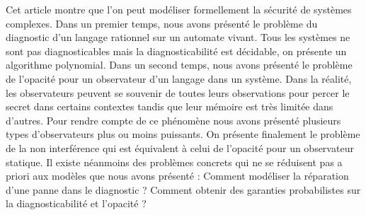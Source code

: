 \documentclass[10pt,a4paper]{article}
\begin{document}
Cet article montre que l'on peut modéliser formellement la sécurité de systèmes complexes. Dans un premier temps, nous avons présenté le problème du diagnostic d'un langage rationnel sur un automate vivant. Tous les systèmes ne sont pas diagnosticables mais la diagnosticabilité est décidable, on présente un algorithme polynomial. Dans un second temps, nous avons présenté le problème de l'opacité  pour un observateur d'un langage dans un système. Dans la réalité, les observateurs peuvent se souvenir de toutes leurs observations pour percer le secret dans certains contextes tandis que leur mémoire est très limitée dans d'autres. Pour rendre compte de ce phénomène nous avons présenté plusieurs types d'observateurs plus ou moins puissants. On présente finalement le problème de la non interférence qui est équivalent à celui de l'opacité pour un observateur statique. Il existe néanmoins des problèmes concrets qui ne se réduisent pas a priori aux modèles que nous avons présenté : Comment modéliser la réparation d'une panne dans le diagnostic ? Comment obtenir des garanties probabilistes sur la diagnosticabilité et l'opacité ?


\end{document}
